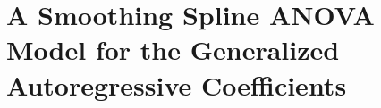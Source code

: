 




\section{A Smoothing Spline ANOVA Model for the Generalized Autoregressive Coefficients}\label{RKHS-framework-for-phi}


